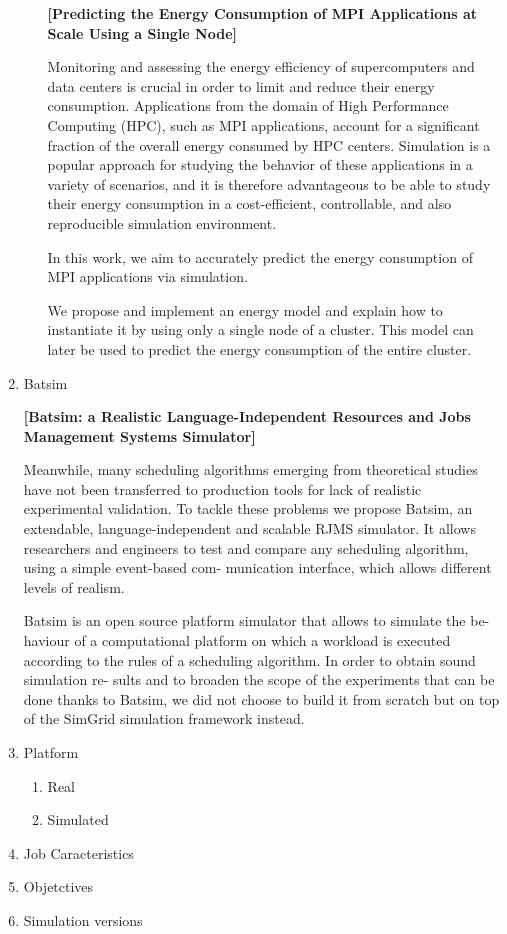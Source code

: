\documentclass[a4paper,titlepage]{article}
\begin{document}
\begin{enumerate}
\begin{enumerate}
\textbf{[Predicting the Energy Consumption of MPI Applications at Scale Using a Single Node]}

Monitoring and assessing the energy efficiency of
supercomputers and data centers is crucial in order to limit
and reduce their energy consumption. Applications from the
domain of High Performance Computing (HPC), such as MPI
applications, account for a significant fraction of the overall
energy consumed by HPC centers. Simulation is a popular
approach for studying the behavior of these applications in
a variety of scenarios, and it is therefore advantageous to
be able to study their energy consumption in a cost-efficient,
controllable, and also reproducible simulation environment. 

In this work,
we aim to accurately predict the energy consumption of MPI
applications via simulation.

We propose and implement an energy model and explain
how to instantiate it by using only a single node of a cluster.
This model can later be used to predict the energy consumption
of the entire cluster.
\end{enumerate}

\item Batsim

\label{sec-3-2}
\textbf{[Batsim: a Realistic Language-Independent Resources and Jobs Management Systems Simulator]}

 Meanwhile, many scheduling
algorithms emerging from theoretical studies have not been transferred
to production tools for lack of realistic experimental validation. To tackle
these problems we propose Batsim, an extendable, language-independent
and scalable RJMS simulator. It allows researchers and engineers to test
and compare any scheduling algorithm, using a simple event-based com-
munication interface, which allows different levels of realism.

Batsim is an open source platform simulator that allows to simulate the be-
haviour of a computational platform on which a workload is executed according
to the rules of a scheduling algorithm. In order to obtain sound simulation re-
sults and to broaden the scope of the experiments that can be done thanks to
Batsim, we did not choose to build it from scratch but on top of the SimGrid
simulation framework instead.

\item Platform
\label{sec-3-3}
\begin{enumerate}
\item Real
\label{sec-3-3-1}

\item Simulated
\label{sec-3-3-2}
\end{enumerate}

\item Job Caracteristics
\label{sec-3-4}
\item Objetctives
\label{sec-3-5}
\item Simulation versions
\label{sec-3-6}
\end{enumerate}
\end{document}
